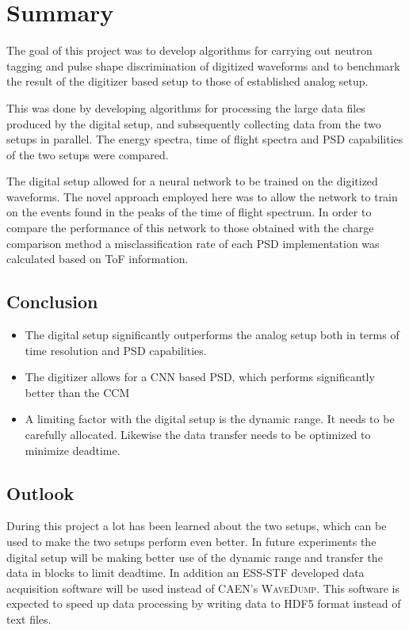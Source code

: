 \documentclass[main.tex]{subfiles}
\begin{document}
\chapter{Summary}
The goal of this project was to develop algorithms for carrying out neutron tagging and pulse shape discrimination of digitized waveforms and to benchmark the result of the digitizer based setup to those of established analog setup.

This was done by developing algorithms for processing the large data files produced by the digital setup, and subsequently collecting data from the two setups in parallel. The energy spectra, time of flight spectra and PSD capabilities of the two setups were compared.

The digital setup allowed for a neural network to be trained on the digitized waveforms. The novel approach employed here was to allow the network to train on the events found in the peaks of the time of flight spectrum. In order to compare the performance of this network to those obtained with the charge comparison method a misclassification rate of each PSD implementation was calculated based on ToF information.



\section{Conclusion}

\begin{itemize}
	\item The digital setup significantly outperforms the analog setup both in terms of time resolution and PSD capabilities.
	\item The digitizer allows for a CNN based PSD, which performs significantly better than the CCM
	\item A limiting factor with the digital setup is the dynamic range. It needs to be carefully allocated. Likewise the data transfer needs to be optimized to minimize deadtime.
\end{itemize}

\section{Outlook}
During this project a lot has been learned about the two setups, which can be used to make the two setups perform even better. In future experiments the digital setup will be making better use of the dynamic range and transfer the data in blocks to limit deadtime. In addition an ESS-STF developed data acquisition software will be used instead of CAEN's \textsc{WaveDump}. This software is expected to speed up data processing by writing data to HDF5 format instead of text files.
\end{document}
